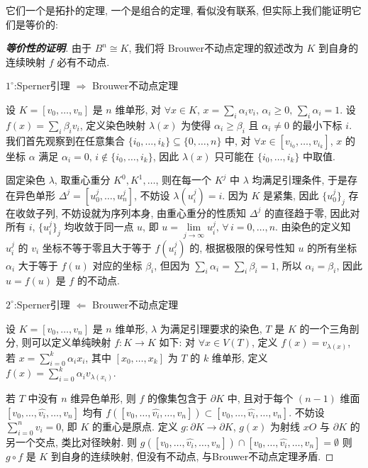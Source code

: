     它们一个是拓扑的定理, 一个是组合的定理, 看似没有联系, 
    但实际上我们能证明它们是等价的: 
    \begin{proof}[{\bf 等价性的证明}]
        由于 $B^n\cong K$, 我们将 Brouwer不动点定理的叙述改为 
        $K$ 到自身的连续映射 $f$ 必有不动点.

        $1^{\circ}$:Sperner引理 $\Rightarrow$ Brouwer不动点定理
        
        设 $K = [v_0,\dots,v_n]$ 是 $n$ 维单形, 对 $\forall x\in K$, 
        $x=\sum_i\alpha_iv_i,\,\alpha_i\geqslant0,\,\sum_i\alpha_i=1$. 
        设 $f(x) = \sum_i\beta_iv_i$, 定义染色映射 
        $\lambda(x)$ 为使得 $\alpha_i\geqslant\beta_i$ 
        且 $\alpha_i\neq0$ 的最小下标 $i$. 
        我们首先观察到在任意集合 $\{i_0,\dots,i_k\}\subseteq\{0,\dots,n\}$ 中, 
        对 $\forall x\in[v_{i_0},\dots,v_{i_k}]$, $x$ 的坐标 $\alpha$ 满足 
        $\alpha_i=0,\,i\notin\{i_0,\dots,i_k\}$, 
        因此 $\lambda(x)$ 只可能在 $\{i_0,\dots,i_k\}$ 中取值.

        固定染色 $\lambda$, 取重心重分 $K^0,K^1,\dots$, 
        则在每一个 $K^j$ 中 $\lambda$ 均满足引理条件, 
        于是存在异色单形 $\Delta^j=[u^j_0,\dots,u^j_n]$, 
        不妨设 $\lambda(u^j_i)=i$.
        因为 $K$ 是紧集, 因此 $\{u^j_0\}_j$ 存在收敛子列, 
        不妨设就为序列本身, 由重心重分的性质知 $\Delta^j$ 的直径趋于零, 
        因此对所有 $i$, $\{u^j_i\}_j$ 均收敛于同一点 $u$, 即 
        $u=\lim\limits_{j\rightarrow\infty}u^j_i,\,\forall\,i=0,\dots,n$. 
        由染色的定义知 $u^j_i$ 的 $v_i$ 坐标不等于零且大于等于 $f(u^j_i)$ 的, 
        根据极限的保号性知 
        $u$ 的所有坐标 $\alpha_i$ 大于等于 $f(u)$ 对应的坐标 $\beta_i$, 
        但因为 $\sum_i\alpha_i = \sum_i\beta_i = 1$, 
        所以 $\alpha_i=\beta_i$, 因此 $u = f(u)$ 是 $f$ 的不动点.

        $2^{\circ}$:Sperner引理 $\Leftarrow$ Brouwer不动点定理
        
        设 $K = [v_0,\dots,v_n]$ 是 $n$ 维单形, 
        $\lambda$ 为满足引理要求的染色, $T$ 是 $K$ 的一个三角剖分, 
        则可以定义单纯映射 $f:K\rightarrow K$ 如下: 对 $\forall x\in V(T)$, 
        定义 $f(x) = v_{\lambda(x)}$, 若 $x = \sum_{i=0}^{k}\alpha_ix_i$, 
        其中 $[x_0,\dots,x_k]$ 为 $T$ 的 $k$ 维单形, 
        定义 $f(x) = \sum_{i=0}^{k}\alpha_iv_{\lambda(x_i)}$.

        若 $T$ 中没有 $n$ 维异色单形, 则 $f$ 的像集包含于 $\partial K$ 中, 
        且对于每个 $(n-1)$ 维面 $[v_0,\dots,\hat{v_i},\dots,v_n]$ 均有 
        $f([v_0,\dots,\hat{v_i},\dots,v_n])\subset[v_0,\dots,\hat{v_i},\dots,v_n]$.
        不妨设 $\sum_{i=0}^{n}v_i = 0$, 即 $K$ 的重心是原点. 
        定义 $g:\partial K\rightarrow \partial K$, 
        $g(x)$ 为射线 $xO$ 与 $\partial K$ 的另一个交点, 类比对径映射. 
        则 $g([v_0,\dots,\hat{v_i},\dots,v_n])\cap[v_0,\dots,\hat{v_i},\dots,v_n]=\emptyset$
        则 $g\circ f$ 是 $K$ 到自身的连续映射, 但没有不动点, 
        与Brouwer不动点定理矛盾.
    \end{proof}
    
